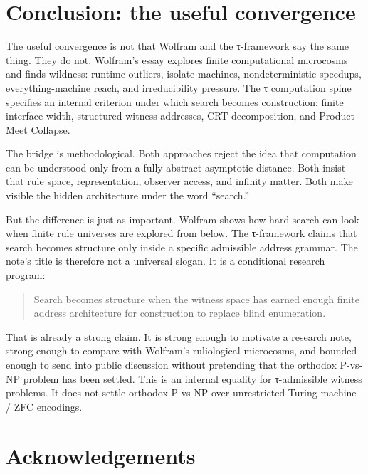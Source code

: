 \documentclass{pantarhei-researchnote}
\begin{document}
\onecolumn
\section{Conclusion: the useful convergence}
\label{sec:conclusion}

The useful convergence is not that Wolfram and the τ-framework say the
same thing. They do not. Wolfram's essay explores finite computational
microcosms and finds wildness: runtime outliers, isolate machines,
nondeterministic speedups, everything-machine reach, and irreducibility
pressure. The τ computation spine specifies an internal criterion under
which search becomes construction: finite interface width, structured
witness addresses, CRT decomposition, and Product-Meet Collapse.

The bridge is methodological. Both approaches reject the idea that
computation can be understood only from a fully abstract asymptotic
distance. Both insist that rule space, representation, observer access,
and infinity matter. Both make visible the hidden architecture under the
word ``search.''

But the difference is just as important. Wolfram shows how hard search can
look when finite rule universes are explored from below. The τ-framework
claims that search becomes structure only inside a specific admissible
address grammar. The note's title is therefore not a universal slogan. It
is a conditional research program:

\begin{quote}\small
Search becomes structure when the witness space has earned enough finite
address architecture for construction to replace blind enumeration.
\end{quote}

That is already a strong claim. It is strong enough to motivate a research
note, strong enough to compare with Wolfram's ruliological microcosms, and
bounded enough to send into public discussion without pretending that the
orthodox P-vs-NP problem has been settled.
This is an internal equality for τ-admissible witness problems. It does
not settle orthodox P vs NP over unrestricted Turing-machine / ZFC
encodings.

\section*{Acknowledgements}
\label{sec:ack}
\end{document}
